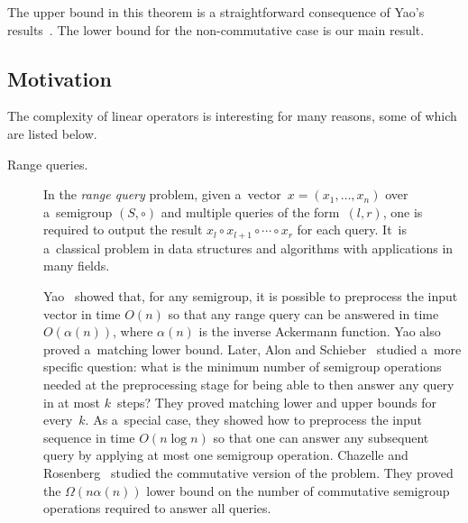 \documentclass{toc}
\begin{document}
The upper bound in this theorem
is a straightforward consequence of Yao's results~\cite{DBLP:conf/stoc/Yao82}.
The  %
lower bound %
for the non-commutative case is our main result.  %

\subsection{Motivation}
The complexity of linear operators is interesting for many reasons, some of
which are listed below.

\begin{description}
\item[Range queries.] In the 
\emph{range query} problem,
 given a~vector~$x=(x_1, \dotsc, x_n)$ over a~semigroup $(S, \circ)$ and
multiple queries of the form~$(l,r)$, one is required to
output the result $x_l \circ x_{l+1} \circ \dotsb \circ x_r$
for each query. It~is a~classical problem in data structures and
algorithms with applications in many fields.

Yao~\cite{DBLP:conf/stoc/Yao82} showed that, for any semigroup, it is possible
to preprocess the input vector in time $O(n)$ so that
any range query can be answered %
in time $O(\alpha(n))$, where $\alpha(n)$ is the inverse Ackermann 
function.  Yao also  %
proved a~matching lower bound.
Later, Alon and
Schieber~\cite{Alon87optimalpreprocessing} studied a~more specific question:
what is the minimum number of semigroup operations needed at the preprocessing
stage for being able to then answer any query in at most $k$~steps? They proved
matching lower and upper bounds for every~$k$. As a~special case, they showed
how to preprocess the input sequence in time $O(n\log n)$
so that one can %
answer any
subsequent query by applying at most one semigroup operation.
Chazelle and Rosenberg~\cite{DBLP:journals/ijcga/ChazelleR91} studied the
commutative version of the problem. They proved the $\Omega(n \alpha(n))$ lower
bound on the number of commutative semigroup operations required to answer all
queries.


\end{description}
\end{document}
